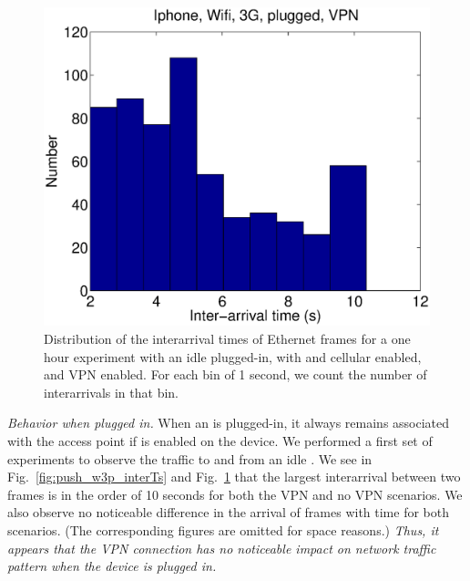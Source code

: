 \begin{figure}
\centering
        \includegraphics[width=0.8\linewidth]{../../code/pushNotification/Fig/bw_iphone_wifi_3g_plug_vpn_interTs.eps}
  \caption{Distribution of the interarrival times of Ethernet frames
    for a one hour experiment with an idle \iphone{} plugged-in, with \wifi{} and cellular
    enabled, and VPN enabled. For each bin of 1 second, we count
    the number of interarrivals in that bin.}
  \label{fig:push_w3pv_interTs}
\end{figure}


\noindent\emph{Behavior when plugged in.} When an \iphone{} is plugged-in, it always remains associated with the
\wifi{} access point if \wifi{} is enabled on the device. We performed
a first set of experiments to observe the traffic to and from an idle
\iphone{}. We see in Fig.~\ref{fig:push_w3p_interTs} and
Fig.~\ref{fig:push_w3pv_interTs} that the largest interarrival between
two frames is in the order of 10 seconds for both the VPN and no VPN
scenarios. We also observe no noticeable difference in the arrival of
frames with time for both scenarios. (The corresponding figures are 
omitted for space reasons.)
\emph{Thus, it appears that the VPN connection has no noticeable
  impact on network traffic pattern when the device is plugged in.}

